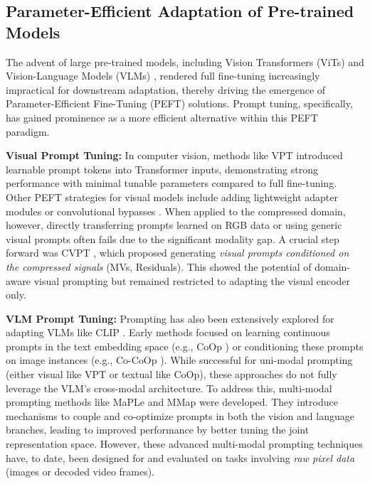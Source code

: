 \documentclass[letterpaper]{article} %
\begin{document}
\subsection{Parameter-Efficient Adaptation of Pre-trained Models}
\label{subsec:peft_adaptation}

The advent of large pre-trained models, including Vision Transformers (ViTs) and Vision-Language Models (VLMs) \cite{radford2021learning,yuan2021florence}, rendered full fine-tuning increasingly impractical for downstream adaptation, thereby driving the emergence of Parameter-Efficient Fine-Tuning (PEFT) solutions. Prompt tuning, specifically, has gained prominence as a more efficient alternative within this PEFT paradigm.

\textbf{Visual Prompt Tuning:} In computer vision, methods like VPT \cite{jia2022visual} introduced learnable prompt tokens into Transformer inputs, demonstrating strong performance with minimal tunable parameters compared to full fine-tuning. Other PEFT strategies for visual models include adding lightweight adapter modules \cite{chen2022adaptformer} or convolutional bypasses \cite{jie2024convolutional}. When applied to the compressed domain, however, directly transferring prompts learned on RGB data or using generic visual prompts often fails due to the significant modality gap. A crucial step forward was CVPT \cite{li2023compressed}, which proposed generating \textit{visual prompts conditioned on the compressed signals} (MVs, Residuals). This showed the potential of domain-aware visual prompting but remained restricted to adapting the visual encoder only.

\textbf{VLM Prompt Tuning:} Prompting has also been extensively explored for adapting VLMs like CLIP \cite{radford2021learning}. Early methods focused on learning continuous prompts in the text embedding space (e.g., CoOp \cite{zhou2022learning}) or conditioning these prompts on image instances (e.g., Co-CoOp \cite{zhou2022conditional}). While successful for uni-modal prompting (either visual like VPT or textual like CoOp), these approaches do not fully leverage the VLM's cross-modal architecture. To address this, multi-modal prompting methods like MaPLe \cite{khattak2023maple} and MMap \cite{xin2024mmap} were developed. They introduce mechanisms to couple and co-optimize prompts in both the vision and language branches, leading to improved performance by better tuning the joint representation space. However, these advanced multi-modal prompting techniques have, to date, been designed for and evaluated on tasks involving \textit{raw pixel data} (images or decoded video frames).
\end{document}
